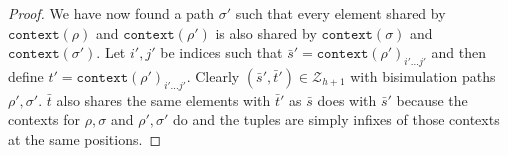 \documentclass[draft]{scrartcl}
\theoremstyle{definition}
\newcommand{\context}[1]{\mathtt{context}(#1)}
\begin{document}
\begin{proof}
  We have now found a path $\sigma'$ such that every element shared by $\context{\rho}$ and $\context{\rho'}$ is also shared by $\context{\sigma}$ and $\context{\sigma'}$.
  Let $i',j'$ be indices such that $\bar{s}' = \context{\rho'}_{i'\ldots{}j'}$ and then define $t' = \context{\rho'}_{i'\ldots{}j'}$.
  Clearly $(\bar{s}', \bar{t}') \in \mathcal{Z}_{h+1}$ with bisimulation paths $\rho', \sigma'$.
  $\bar{t}$ also shares the same elements with $\bar{t}'$ as $\bar{s}$ does with $\bar{s}'$ because the contexts for $\rho, \sigma$ and $\rho', \sigma'$ do and the tuples are simply infixes of those contexts at the same positions.
\end{proof}
\end{document}
